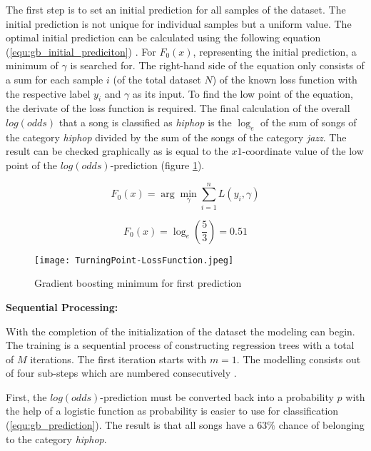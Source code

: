 The first step is to set an initial prediction for all samples of the dataset. The initial 
prediction is not unique for individual samples but a uniform value. The optimal initial 
prediction can be calculated using the following equation (\ref{equ:gb_initial_prediciton}) \cite[p.361]{Hastie_2009}. For \(F_{0}(x)\), representing the 
initial prediction, a minimum of \(\gamma \) is searched for. The right-hand side of the equation 
only consists of a sum for each sample \(i\) (of the total dataset \(N\)) of the known loss function 
with the respective label \(y_{i}\) and \(\gamma \) as its input. To find the low point of the equation, 
the derivate of the loss function is required. The final calculation of the overall \(log (odds)\) 
that a song is classified as \emph{hiphop} is the \(\log_{e}\) of the sum of songs of the category \emph{hiphop}
divided by the sum of the songs of the category \emph{jazz}. The result can be checked graphically 
as is equal to the \(x1\)-coordinate value of the low point of the \(log(odds)\)-prediction (figure \ref{fig:gb_turning_point-loss_function}). 

\begin{equation}
    F_{0}(x) = \arg \min_{\gamma } \sum_{i= 1}^{n} L(y_{i}, \gamma)
    \label{equ:gb_initial_prediciton}
\end{equation}

\begin{equation*}
    F_{0}(x) = \log_{e}(\frac{5}{3}) = 0.51
\end{equation*}

\begin{figure}[H]
    \centering
    \caption[]{Gradient boosting minimum for first prediction}
	\label{fig:gb_turning_point-loss_function}
    \texttt{[image: TurningPoint-LossFunction.jpeg]}
\end{figure}

\textbf{Sequential Processing:}

With the completion of the initialization of the dataset the modeling can begin. The training is a sequential 
process of constructing regression trees with a total of \(M\) iterations. The first iteration 
starts with \(m = 1\). The modelling consists out of four sub-steps which are numbered consecutively \cite[p.1198]{Friedman_2001}.

First, the \(log(odds)\)-prediction must be converted back into a probability \(p\) with the help of a 
logistic function as probability is easier to use for classification (\ref{equ:gb_prediction}). The result is 
that all songs have a \(63\%\) chance of belonging to the category \emph{hiphop}.


